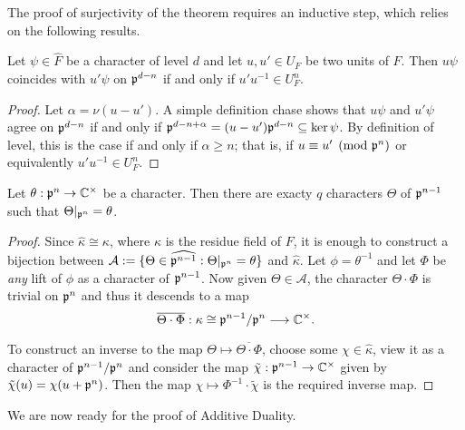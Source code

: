 The proof of surjectivity of the theorem requires an inductive step, which relies on the following results.

\begin{lemma}\label{lem_congruence}
    Let $\psi\in\hat{F}$ be a character of level $d$ and let $u,u'\in U_F$ be two units of $F$. Then $u\psi$ coincides with $u'\psi$ on $\mathfrak{p}^{d-n}$ if and only if $u'u^{-1}\in U_F^{n}$.
\end{lemma}
\begin{proof}
    Let $\alpha=\nu(u-u')$. A simple definition chase shows that $u\psi$ and $u'\psi$ agree on $\mathfrak{p}^{d-n}$ if and only if $\mathfrak{p}^{d-n+\alpha}=(u-u')\mathfrak{p}^{d-n}\subseteq\ker\psi$. By definition of level, this is the case if and only if $\alpha\geq n$; that is, if $u\equiv u'\pmod{\mathfrak{p}^n}$ or equivalently $u'u^{-1}\in U_F^{n}$.
\end{proof}

\begin{lemma}\label{lem_chars}
    Let $\theta:\mathfrak{p}^{n}\rightarrow\mathbb{C}^{\times}$ be a character. Then there are exacty $q$ characters $\Theta$ of $\mathfrak{p}^{n-1}$ such that $\Theta|_{\mathfrak{p}^n}=\theta$.
\end{lemma}

\begin{proof}
    Since $\hat\kappa\cong\kappa$, where $\kappa$ is the residue field of $F$, it is enough to construct a bijection between $\mathcal{A}:=\{\Theta\in\widehat{\mathfrak{p}^{n-1}}:\Theta|_{\mathfrak{p}^n}=\theta\}$ and $\hat{\kappa}$. Let $\phi=\theta^{-1}$ and let $\Phi$ be \textit{any} lift of $\phi$ as a character of $\mathfrak{p}^{n-1}$. Now given $\Theta\in\mathcal{A}$, the character $\Theta\cdot\Phi$ is trivial on $\mathfrak{p}^{n}$ and thus it descends to a map 
    $$\overline{\Theta\cdot\Phi}:\kappa\cong\mathfrak{p}^{n-1}/\mathfrak{p}^n\longrightarrow\mathbb{C}^{\times}.$$

    To construct an inverse to the map $\Theta\mapsto\overline{\Theta\cdot\Phi}$, choose some $\chi\in\hat\kappa$, view it as a character of $\mathfrak{p}^{n-1}/\mathfrak{p}^{n}$ and consider the map $\tilde\chi:\mathfrak{p}^{n-1}\rightarrow\mathbb{C}^{\times}$ given by $\tilde{\chi}(u)=\chi(u+\mathfrak{p}^n)$. Then the map $\chi\mapsto\Phi^{-1}\cdot\tilde\chi$ is the required inverse map.
\end{proof}

We are now ready for the proof of Additive Duality.

